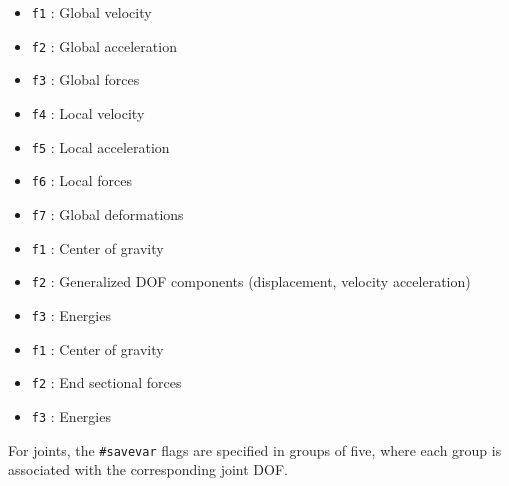 

\begin{itemize}
\item{\tt f1} : Global velocity
\item{\tt f2} : Global acceleration
\item{\tt f3} : Global forces
\item{\tt f4} : Local velocity
\item{\tt f5} : Local acceleration
\item{\tt f6} : Local forces
\item{\tt f7} : Global deformations
\end{itemize}




\begin{itemize}
\item{\tt f1} : Center of gravity
\item{\tt f2} : Generalized DOF components (displacement, velocity acceleration)
\item{\tt f3} : Energies
\end{itemize}




\begin{itemize}
\item{\tt f1} : Center of gravity
\item{\tt f2} : End sectional forces
\item{\tt f3} : Energies
\end{itemize}

\clearpage



For joints, the {\tt\#savevar} flags are specified in groups of five,
where each group is associated with the corresponding joint DOF.


